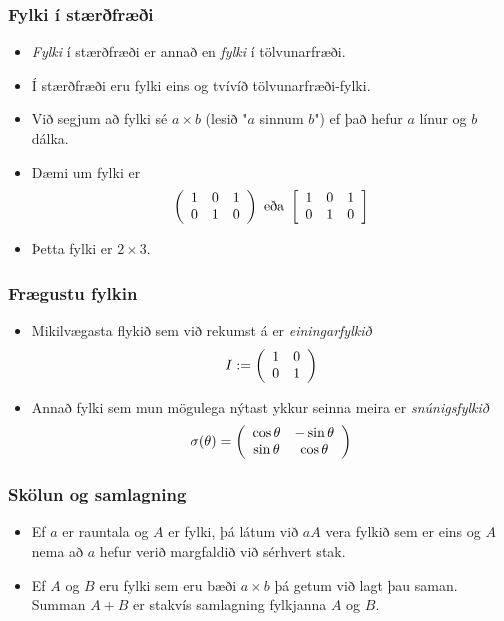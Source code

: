 \documentclass{beamer}
\begin{document}
\begin{frame}
	\frametitle{Fylki í stærðfræði}
	\begin{itemize}
		\item<1-> \emph{Fylki} í stærðfræði er annað en \emph{fylki} í tölvunarfræði.
		\item<2-> Í stærðfræði eru fylki eins og tvívíð tölvunarfræði-fylki.
		\item<3-> Við segjum að fylki sé $a \times b$ (lesið "$a$ sinnum $b$") ef það hefur $a$ línur og $b$ dálka.
		\item<4-> Dæmi um fylki er
			\[
				\left (
				\begin{array}{c c c}
					1 & 0 & 1\\
					0 & 1 & 0
				\end{array}
				\right )
				\text{ eða }
				\left [
				\begin{array}{c c c}
					1 & 0 & 1\\
					0 & 1 & 0
				\end{array}
				\right ]
			\]
		\item<5-> Þetta fylki er $2 \times 3$.
	\end{itemize}
\end{frame}

\begin{frame}
	\frametitle{Frægustu fylkin}
	\begin{itemize}
		\item<1-> Mikilvægasta flykið sem við rekumst á er \emph{einingarfylkið}
			\[
				I :=
				\left (
				\begin{array}{c c}
					1 & 0\\
					0 & 1
				\end{array}
				\right )
			\]
		\item<2-> Annað fylki sem mun mögulega nýtast ykkur seinna meira er \emph{snúnigsfylkið}
			\[
			\sigma(\theta) =
				\left (
				\begin{array}{c c}
					\cos \theta & -\sin \theta\\
					\sin \theta & \cos \theta
				\end{array}
				\right )
			\]
	\end{itemize}
\end{frame}

\begin{frame}
	\frametitle{Skölun og samlagning}
	\begin{itemize}
		\item<1-> Ef $a$ er rauntala og $A$ er fylki, þá látum við $aA$ vera fylkið sem er eins og $A$ nema að $a$ hefur verið
			margfaldið við sérhvert stak.
		\item<2-> Ef $A$ og $B$ eru fylki sem eru bæði $a \times b$ þá getum við lagt þau saman. Summan $A + B$ er stakvís samlagning
			fylkjanna $A$ og $B$.
	\end{itemize}
\end{frame}
\end{document}
